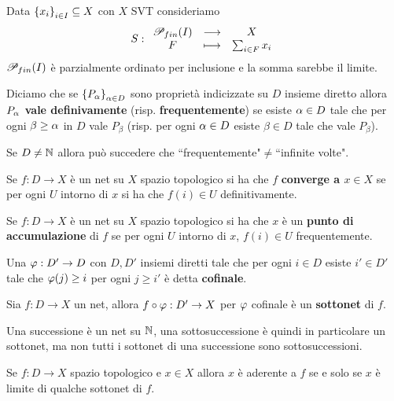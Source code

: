 \begin{example}
Data $\left\{{x_i}\right\}_{i\in I}\subseteq X$ con $X$ SVT consideriamo
\[S:\begin{array}{ccc} {\mathscr{P}_{fin}(I)} & \longrightarrow & {X}\\ {F} & \longmapsto & {\sum_{i\in F}x_i} \end{array}\]
$\mathscr{P}_{fin}(I)$ \`e parzialmente ordinato per inclusione e la somma sarebbe il limite.
\end{example}

\begin{definition}
Diciamo che se $\left\{{P_\alpha}\right\}_{\alpha\in D}$ sono propriet\`a indicizzate su $D$ insieme diretto allora \textbf{$P_\alpha$ vale definivamente} (risp. \textbf{frequentemente}) se esiste $\alpha\in D$ tale che per ogni $\beta\geq \alpha$ in $D$ vale $P_\beta$ (risp. per ogni $\alpha\in D$ esiste $\beta\in D$ tale che vale $P_\beta$).
\end{definition}
\begin{remark}
Se $D\neq \mathbb{N}$ allora pu\`o succedere che ``frequentemente"$\neq$``infinite volte".
\end{remark}

\begin{definition}
Se $f:D\to X$ \`e un net su $X$ spazio topologico si ha che $f$ \textbf{converge a $x\in X$} se per ogni $U$ intorno di $x$ si ha che $f(i)\in U$ definitivamente.
\end{definition}

\begin{definition}
Se $f:D\to X$ \`e un net su $X$ spazio topologico si ha che $x$ \`e un \textbf{punto di accumulazione} di $f$ se per ogni $U$ intorno di $x$, $f(i)\in U$ frequentemente.
\end{definition}

\begin{definition}[Sottonet]
Una $\varphi:D'\to D$ con $D,D'$ insiemi diretti tale che per ogni $i\in D$ esiste $i'\in D'$ tale che $\varphi(j)\geq i$ per ogni $j\geq i'$ \`e detta \textbf{cofinale}.

Sia $f:D\to X$ un net, allora $f\circ\varphi:D'\to X$ per $\varphi$ cofinale \`e un \textbf{sottonet} di $f$.
\end{definition}
\begin{remark}
Una successione \`e un net su $\mathbb{N}$, una sottosuccessione \`e quindi in particolare un sottonet, ma non tutti i sottonet di una successione sono sottosuccessioni.
\end{remark}

\begin{exercise}
Se $f:D\to X$ spazio topologico e $x\in X$ allora $x$ \`e aderente a $f$ se e solo se $x$ \`e limite di qualche sottonet di $f$.
\end{exercise}

